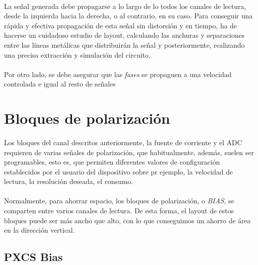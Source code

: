 \paragraph{}
La señal generada debe propagarse a lo largo de lo todos los canales de lectura,
desde la izquierda hacia la derecha, o al contrario, en su caso. Para conseguir
una rápida y efectiva propagación de esta señal sin distorsión y en tiempo, ha
de hacerse un cuidadoso estudio de layout, calculando las anchuras y separaciones
entre las líneas metálicas que distribuirán la señal y posteriormente, realizando
una precisa extracción y simulación del circuito.


\paragraph{}
Por otro lado, se debe asegurar que las \textit{fases} se propaguen a una velocidad
controlada e igual al resto de señales

\section{Bloques de polarización}\label{cap:ro_sch_bias}

\paragraph{}
Los bloques del canal descritos anteriormente, la fuente de corriente y el ADC
requieren de varias señales de polarización, que habitualmente, además, suelen
ser programables, esto es, que permiten diferentes valores de configuración
establecidos por el usuario del dispositivo sobre pr ejemplo, la velocidad de
lectura, la resolución deseada, el consumo.

\paragraph{}
Normalmente, para ahorrar espacio, los bloques de polarización, o \textit{BIAS},
se comparten entre varios canales de lectura. De esta forma, el layout de estos
bloques puede ser más ancho que alto, con lo que conseguimos un ahorro de área en
la dirección vertical.

\subsection{PXCS Bias}

